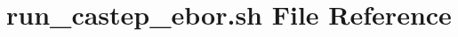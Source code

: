 \hypertarget{run__castep__ebor_8sh}{}\section{run\+\_\+castep\+\_\+ebor.\+sh File Reference}
\label{run__castep__ebor_8sh}
